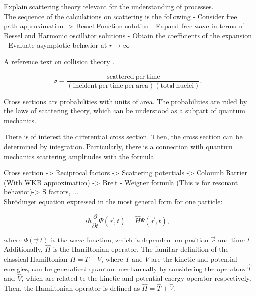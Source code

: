 \documentclass[openany]{book}
\begin{document}

Explain scattering theory relevant for the understanding of  processes. \\

The sequence of the calculations on scattering is the following
-	Consider free path approximation -> Bessel Function solution  
-	Expand free wave in terms of Bessel and Harmonic oscillator solutions
-	Obtain the coefficients of the expansion 
-	Evaluate asymptotic behavior at $r \rightarrow \infty$

A reference text on collision theory \cite{joachain_1983}.

\begin{equation} \label{eq:crossSection_definition}
	\sigma  = \frac{\mathrm{scattered \ per \ time}}{(\mathrm{incident \ per \ time \ per \ area} )(\mathrm{total \ nuclei})}.
\end{equation}

Cross sections are probabilities with units of area. 
The probabilities are ruled by the laws of scattering theory, which can be understood as a subpart of quantum mechanics. 

There is of interest the differential cross section.  Then, the cross section can be determined by integration. Particularly, there is a connection with quantum mechanics scattering amplitudes with the formula


Cross section -> Reciprocal factors -> Scattering potentials -> Coloumb Barrier (With WKB approximation) -> Breit - Weigner formula (This is for resonant behavior)-> S factors, ... \\ 

Shrödinger equation expressed in the most general form for one particle:  

\begin{equation}\label{eq:scattering_Schrodinger_general}
	i \hbar \frac{\partial}{\partial t} \Psi (\vec r, t)= \hat H \Psi (\vec r, t),
\end{equation}

where $\Psi(\vec, t)$ is the wave function, which is dependent on position $\vec r$ and time $t$. Additionally, $\hat H$ is the Hamiltonian operator. The familiar definition of the classical Hamiltonian $H = T + V$, where $T$ and $V$ are the kinetic and potential energies, can be generalized quantum mechanically by considering the operators $\hat T$ and $\hat V$, which are related to the kinetic and potential energy operator respectively. Then, the Hamiltonian operator is defined as $\hat H = \hat T + \hat V$. \\
\end{document}
